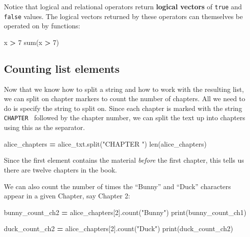 \documentclass[
]{book}
\newenvironment{Shaded}{\begin{snugshade}}{\end{snugshade}}
\newcommand{\BuiltInTok}[1]{#1}
\newcommand{\DecValTok}[1]{\textcolor[rgb]{0.00,0.00,0.81}{#1}}
\newcommand{\NormalTok}[1]{#1}
\newcommand{\OperatorTok}[1]{\textcolor[rgb]{0.81,0.36,0.00}{\textbf{#1}}}
\newcommand{\StringTok}[1]{\textcolor[rgb]{0.31,0.60,0.02}{#1}}
\begin{document}
Notice that logical and relational operators return \textbf{logical vectors} of \texttt{true} and \texttt{false} values.
The logical vectors returned by these operators can themselves be operated on by functions:

\begin{Shaded}
\begin{Highlighting}[]
\NormalTok{x }\OperatorTok{>} \DecValTok{7}
\BuiltInTok{sum}\NormalTok{(x }\OperatorTok{>} \DecValTok{7}\NormalTok{)}
\end{Highlighting}
\end{Shaded}

\hypertarget{counting-list-elements}{%
\subsection{Counting list elements}\label{counting-list-elements}}

Now that we know how to split a string and how to work with the resulting list, we can split on chapter markers to count the number of chapters. All we need to do is specify the string to split on. Since each chapter is marked with the string \texttt{\textquotesingle{}CHAPTER\ \textquotesingle{}} followed by the chapter number, we can split the text up into chapters using this as the separator.

\begin{Shaded}
\begin{Highlighting}[]
\NormalTok{alice_chapters }\OperatorTok{=}\NormalTok{ alice_txt.split(}\StringTok{"CHAPTER "}\NormalTok{)}
\BuiltInTok{len}\NormalTok{(alice_chapters)}
\end{Highlighting}
\end{Shaded}

Since the first element contains the material \emph{before} the first chapter, this tells us there are twelve chapters in the book.

We can also count the number of times the ``Bunny'' and ``Duck'' characters appear in a given Chapter, say Chapter 2:

\begin{Shaded}
\begin{Highlighting}[]
\NormalTok{bunny_count_ch2 }\OperatorTok{=}\NormalTok{ alice_chapters[}\DecValTok{2}\NormalTok{].count(}\StringTok{"Bunny"}\NormalTok{)}
\BuiltInTok{print}\NormalTok{(bunny_count_ch1)}

\NormalTok{duck_count_ch2 }\OperatorTok{=}\NormalTok{ alice_chapters[}\DecValTok{2}\NormalTok{].count(}\StringTok{"Duck"}\NormalTok{)}
\BuiltInTok{print}\NormalTok{(duck_count_ch2)}
\end{Highlighting}
\end{Shaded}
\end{document}
